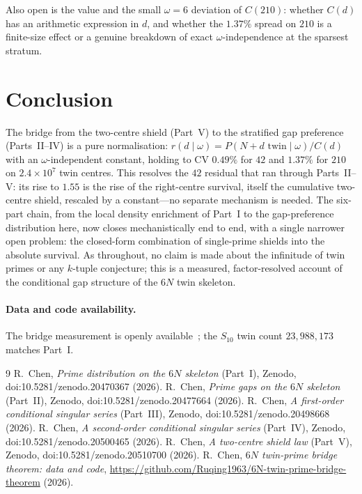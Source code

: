 \documentclass[11pt]{article}
\begin{document}
Also open is the value and the small $\omega=6$ deviation of $C(210)$: whether
$C(d)$ has an arithmetic expression in $d$, and whether the $1.37\%$ spread on
$210$ is a finite-size effect or a genuine breakdown of exact $\omega$-independence
at the sparsest stratum.

\section{Conclusion}

The bridge from the two-centre shield (Part~V) to the stratified gap preference
(Parts~II--IV) is a pure normalisation: $r(d\mid\omega)=P(N{+}d\text{ twin}\mid
\omega)/C(d)$ with an $\omega$-independent constant, holding to CV $0.49\%$ for
$42$ and $1.37\%$ for $210$ on $2.4\times10^{7}$ twin centres. This resolves the
$42$ residual that ran through Parts~II--V: its rise to $1.55$ is the rise of the
right-centre survival, itself the cumulative two-centre shield, rescaled by a
constant---no separate mechanism is needed. The six-part chain, from the local
density enrichment of Part~I to the gap-preference distribution here, now closes
mechanistically end to end, with a single narrower open problem: the closed-form
combination of single-prime shields into the absolute survival. As throughout,
no claim is made about the infinitude of twin primes or any $k$-tuple conjecture;
this is a measured, factor-resolved account of the conditional gap structure of
the $6N$ twin skeleton.

\paragraph{Data and code availability.}
The bridge measurement is openly available~\cite{repo}; the $S_{10}$ twin count
$23{,}988{,}173$ matches Part~I.

\begin{thebibliography}{9}
 R.~Chen, \emph{Prime distribution on the $6N$ skeleton} (Part~I),
Zenodo, doi:10.5281/zenodo.20470367 (2026).
 R.~Chen, \emph{Prime gaps on the $6N$ skeleton} (Part~II),
Zenodo, doi:10.5281/zenodo.20477664 (2026).
 R.~Chen, \emph{A first-order conditional singular series}
(Part~III), Zenodo, doi:10.5281/zenodo.20498668 (2026).
 R.~Chen, \emph{A second-order conditional singular series}
(Part~IV), Zenodo, doi:10.5281/zenodo.20500465 (2026).
 R.~Chen, \emph{A two-centre shield law} (Part~V), Zenodo,
doi:10.5281/zenodo.20510700 (2026).
 R.~Chen, \emph{$6N$ twin-prime bridge theorem: data and code},
\url{https://github.com/Ruqing1963/6N-twin-prime-bridge-theorem} (2026).
\end{thebibliography}
\end{document}
